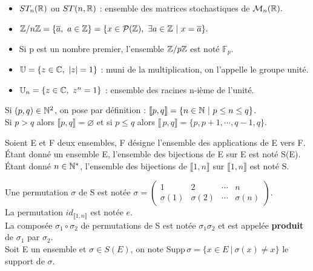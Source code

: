 \begin{itemize}[leftmargin=0cm,label=•]
    \item \(ST_n(\mathbb{R})\) ou \(ST(n,\mathbb{R})\) : ensemble des matrices stochastiques de \(\mathcal{M}_n(\mathbb{R}).\)
     
    \item \(\ZZ /n\ZZ=\{\overline{a},\ a\in \ZZ\}=\{x\in \mathcal{P}(\ZZ),\ \exists a\in \ZZ \ \vert \ x=\overline{a} \}. \) 
    
    \item Si p est un nombre premier, l'ensemble \(\mathbb{Z} /p\mathbb{Z}\) est noté \(\mathbb{F}_p\).
    
    \item \(\mathbb{U}=\{z\in \CC,\ |z|=1\}\) : muni de la multiplication, on l'appelle le groupe unité.
    
    \item \(\mathbb{U}_n=\{z\in \CC,\ z^n=1\}\) : ensemble des racines n-ième de l'unité.
\end{itemize}

\vspace{1.3cm}

Si \((p,q)\in \mathbb{N}^2\), on pose par définition : \(\llbracket p,q \rrbracket = \{n\in \mathbb{N} \ \vert \ p\leq n\leq q \}\).\vspace{0.1cm}\\
Si \(p>q\) alors \(\llbracket p,q \rrbracket = \varnothing\) et si \(p\leq q\) alors \(\llbracket\, p,q \rrbracket = \{p,p+1,\cdots,q-1,q\}\).

\vspace{1.3cm}

\noindent Soient E et F deux ensembles, F désigne l'ensemble des applications de E vers F.\vspace{0.2cm}\\
Étant donné un ensemble E, l'ensemble des bijections de E sur E est noté S(E).\\
Étant donné \(n\in \mathbb{N}^*\), l'ensemble des bijections de \(\llbracket 1,n\rrbracket\) sur \(\llbracket 1,n\rrbracket\) est noté S.

\vspace{1.2cm}

\noindent Une permutation \(\sigma\) de S est notée \(\sigma=\left(
\begin{array}{cccc}
    1 & 2 & \cdots & n \\
    \sigma(1) & \sigma(2) & \cdots & \sigma(n)
\end{array}
 \right).\)\vspace{-0.2cm}\\
La permutation \(id_{\llbracket 1,n\rrbracket}\) est notée \(e\).\\
La composée \(\sigma_1\circ \sigma_2\) de permutations de S est notée \(\sigma_1 \sigma_2\) et est appelée \textbf{produit} de \(\sigma_1\) par \(\sigma_2\).\\
Soit E un ensemble et \(\sigma \in S(E)\), on note Supp\(\, \sigma =\{x\in E \ \vert \ \sigma(x)\neq x \} \) le support de \(\sigma\).

